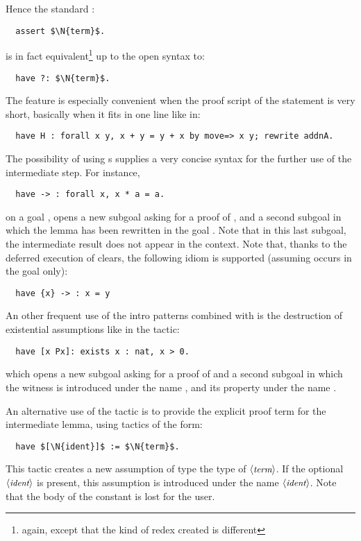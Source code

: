 Hence the standard \Coq{}:
\begin{lstlisting}
  assert $\N{term}$.
\end{lstlisting}
is in fact equivalent\footnote{again, except that the kind of redex
  created is different} up to the open syntax to:
\begin{lstlisting}
  have ?: $\N{term}$.
\end{lstlisting}

The  feature is especially convenient when the proof script of the
statement is very short, basically when it fits in one line like in:
\begin{lstlisting}
  have H : forall x y, x + y = y + x by move=> x y; rewrite addnA.
\end{lstlisting}

The possibility of using \iitem{}s supplies a very concise
syntax for the further use of the intermediate step. For instance,
\begin{lstlisting}
  have -> : forall x, x * a = a.
\end{lstlisting}
on a goal , opens a new subgoal asking for a proof of 
, and a second subgoal in which the lemma
  has been rewritten in the goal . Note
 that in this last subgoal, the intermediate result does not appear in
 the context.
Note that, thanks to the deferred execution of clears, the following 
idiom is supported (assuming  occurs in the goal only):
\begin{lstlisting}
  have {x} -> : x = y
\end{lstlisting}

An other frequent use of the intro patterns combined with  is the
destruction of existential assumptions like in the tactic:
\begin{lstlisting}
  have [x Px]: exists x : nat, x > 0.
\end{lstlisting}
which opens a new subgoal asking for a proof of  and  a second subgoal in which the witness is introduced under
the name , and its property under the name .

An alternative use of the  tactic is to provide the explicit proof
term for the intermediate lemma, using tactics of the form:
\begin{lstlisting}
  have $[\N{ident}]$ := $\N{term}$.
\end{lstlisting}
This tactic creates a new assumption of type the type of
$\langle\mbox{\itshape\rmfamily\small term}\rangle$. If the
optional $\langle\mbox{\itshape\rmfamily\small ident}\rangle$ is present, this assumption is introduced under
the name $\langle\mbox{\itshape\rmfamily\small ident}\rangle$. Note that the body of the constant is lost for
the user.

